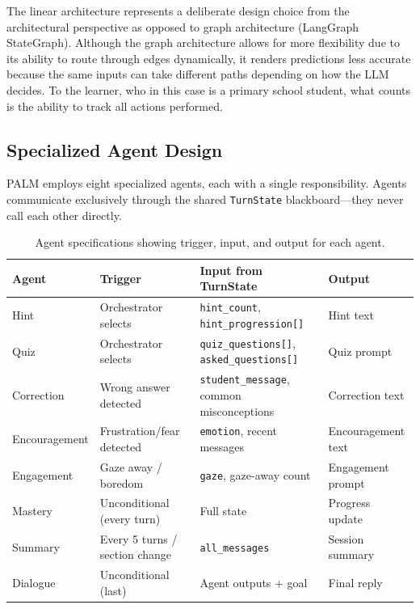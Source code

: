 \documentclass[conference, letterpaper]{IEEEtran}
\begin{document}
The linear architecture represents a deliberate design choice from the architectural perspective as opposed to graph architecture (LangGraph StateGraph). Although the graph architecture allows for more flexibility due to its ability to route through edges dynamically, it renders predictions less accurate because the same inputs can take different paths depending on how the LLM decides. To the learner, who in this case is a primary school student, what counts is the ability to track all actions performed.

\subsection{Specialized Agent Design}

PALM employs eight specialized agents, each with a single responsibility. Agents communicate exclusively through the shared \texttt{TurnState} blackboard---they never call each other directly.

\begin{table}[!t]
\centering
\caption{Agent specifications showing trigger, input, and output for each agent.}
\label{tab:agents}
\small
\begin{tabularx}{\columnwidth}{@{}l>{\raggedright\arraybackslash}p{2.8cm}>{\raggedright\arraybackslash}X>{\raggedright\arraybackslash}p{3cm}@{}}
\toprule
\textbf{Agent} & \textbf{Trigger} & \textbf{Input from TurnState} & \textbf{Output} \\
\midrule
Hint & Orchestrator selects & \texttt{hint\_count}, \texttt{hint\_progression[]} & Hint text \\
Quiz & Orchestrator selects & \texttt{quiz\_questions[]}, \texttt{asked\_questions[]} & Quiz prompt \\
Correction & Wrong answer detected & \texttt{student\_message}, common misconceptions & Correction text \\
Encouragement & Frustration/fear detected & \texttt{emotion}, recent messages & Encouragement text \\
Engagement & Gaze away / boredom & \texttt{gaze}, gaze-away count & Engagement prompt \\
Mastery & Unconditional (every turn) & Full state & Progress update \\
Summary & Every 5 turns / section change & \texttt{all\_messages} & Session summary \\
Dialogue & Unconditional (last) & Agent outputs + goal & Final reply \\
\bottomrule
\end{tabularx}
\end{table}
\end{document}
